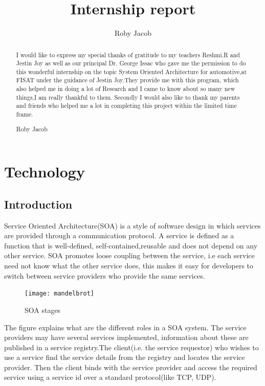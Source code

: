 \documentclass{fisattraining}
\title{Internship report}
\author{Roby Jacob}
\begin{document}
\maketitle
\makecert

\newpage
{}
\setcounter{page}{1}
\thispagestyle{plain}
\newpage
\renewcommand\abstractname{ACKNOWLEDGMENT}
\thispagestyle{plain}
\begin{abstract}
\vspace{5cm}
I would like to express my special thanks of gratitude to my teachers
Reshmi.R and Jestin Joy as well as our principal Dr. George Issac who gave
me the permission to do this wonderful internship on the topic System Oriented Architecture
for automotive,at FISAT under the guidance of Jestin Joy.They provide me with this program, which also helped me in doing a lot of Research and I came to know about so many new things,I am really thankful to them. Secondly
I would also like to thank my parents and friends who helped me a lot in
completing this project within the limited time frame.
\vspace{1cm}
\begin{flushright}
Roby Jacob
\end{flushright}
\end{abstract}
\newpage

\restoregeometry
\tableofcontents
\newpage

\cleardoublepage
{}
\listoffigures
\newpage

\chapter{Technology}
\setcounter{page}{1}
\renewcommand{\baselinestretch}{1.50}
\section{Introduction}
Service Oriented Architecture(SOA) is a style of software design in which  services are provided through a communication protocol. A service is defined as a function that is  well-defined, self-contained,reusable and does not depend on any other service. SOA promotes loose coupling between the service, i.e each service need not know what the other service does, this makes it easy for developers to switch between service providers who provide the same services.
\begin{figure}[h!]
\begin{center}
\texttt{[image: mandelbrot]}
\caption{SOA stages}
\end{center}
\end{figure}
The figure explains what are the different roles in a SOA system. The service providers may have several services implemented, information about these are  published in a service registry.The client(i.e. the service requestor) who wishes to use a service find the service details from the registry and locates the service provider. Then the client binds with the service provider and access the required service using a service id over a standard protocol(like TCP, UDP).
\end{document}
